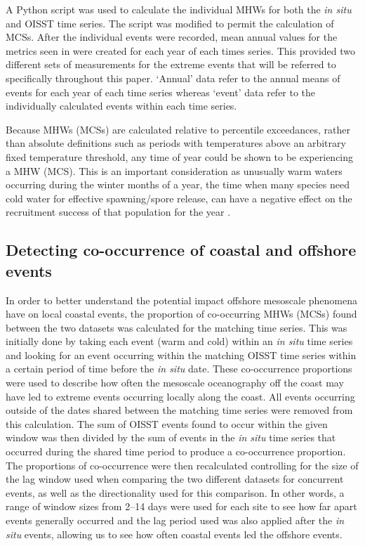 \documentclass[a4paper,10pt,review]{elsarticle}
\begin{document}
A Python script \citep[https://github.com/ecjoliver/marineHeatWaves; see][]{Hobday2016} was used to calculate the individual MHWs for both the \emph{in situ} and OISST time series. The script was modified to permit the calculation of MCSs. After the individual events were recorded, mean annual values for the metrics seen in  were created for each year of each times series. This provided two different sets of measurements for the extreme events that will be referred to specifically throughout this paper. `Annual' data refer to the annual means of events for each year of each time series whereas `event' data refer to the individually calculated events within each time series.

Because MHWs (MCSs) are calculated relative to percentile exceedances, rather than absolute definitions such as periods with temperatures above an arbitrary fixed temperature threshold, any time of year could be shown to be experiencing a MHW (MCS). This is an important consideration as unusually warm waters occurring during the winter months of a year, the time when many species need cold water for effective spawning/spore release, can have a negative effect on the recruitment success of that population for the year \citep{Wernberg2011}.

\subsection{Detecting co-occurrence of coastal and offshore events}
In order to better understand the potential impact offshore mesoscale phenomena have on local coastal events, the proportion of co-occurring MHWs (MCSs) found between the two datasets was calculated for the matching time series. This was initially done by taking each event (warm and cold) within an \emph{in situ} time series and looking for an event occurring within the matching OISST time series within a certain period of time before the \emph{in situ} date. These co-occurrence proportions were used to describe how often the mesoscale oceanography off the coast may have led to extreme events occurring locally along the coast. All events occurring outside of the dates shared between the matching time series were removed from this calculation. The sum of OISST events found to occur within the given window was then divided by the sum of events in the \emph{in situ} time series that occurred during the shared time period to produce a co-occurrence proportion. The proportions of co-occurrence were then recalculated controlling for the size of the lag window used when comparing the two different datasets for concurrent events, as well as the directionality used for this comparison. In other words, a range of window sizes from 2--14 days were used for each site to see how far apart events generally occurred and the lag period used was also applied after the \emph{in situ} events, allowing us to see how often coastal events led the offshore events.
\end{document}
